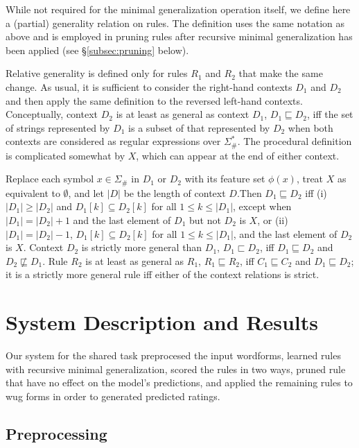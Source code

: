 \documentclass[11pt]{article}
\begin{document}
While not required for the minimal generalization operation itself, we define here a (partial) generality relation on rules. The definition uses the same notation as above and is employed in pruning rules after recursive minimal generalization has been applied (see \S\ref{subsec:pruning} below). 

Relative generality is defined only for rules $R_1$ and $R_2$ that make the same change. As usual, it is sufficient to consider the right-hand contexts $D_1$ and $D_2$ and then apply the same definition to the reversed left-hand contexts. Conceptually, context $D_2$ is at least as general as context $D_1$, $D_1 \sqsubseteq D_2$, iff the set of strings represented by $D_1$ is a subset of that represented by $D_2$ when both contexts are considered as regular expressions over $\Sigma_{\#}^*$. The procedural definition is complicated somewhat by $X$, which can appear at the end of either context.

Replace each symbol $x \in \Sigma_{\#}$ in $D_1$ or $D_2$ with its feature set $\phi(x)$, treat $X$ as equivalent to $\emptyset$, and let $|D|$ be the length of context $D$.Then $D_1 \sqsubseteq D_2$ iff (i) $|D_1| \geq |D_2|$ and $D_1[k] \subseteq D_2[k]$ for all $1 \leq k \leq |D_1|$, except when $|D_1| = |D_2| + 1$ and the last element of $D_1$ but not $D_2$ is $X$, or (ii) $|D_1| = |D_2| - 1$, $D_1[k] \subseteq D_2[k]$ for all $1 \leq k \leq |D_1|$, and the last element of $D_2$ is $X$. Context $D_2$ is strictly more general than $D_1$, $D_1 \sqsubset D_2$, iff $D_1 \sqsubseteq D_2$ and $D_2 \not\sqsubseteq D_1$. Rule $R_2$ is at least as general as $R_1$, $R_1 \sqsubseteq R_2$, iff $C_1 \sqsubseteq C_2$ and $D_1 \sqsubseteq D_2$; it is a strictly more general rule iff either of the context relations is strict.


\section{System Description and Results}
\label{sec:system}

Our system for the shared task preprocesed the input wordforms, learned rules with recursive minimal generalization, scored the rules in two ways, pruned rule that have no effect on the model's predictions, and  applied the remaining rules to wug forms in order to generated predicted ratings.

\subsection{Preprocessing}
\end{document}
